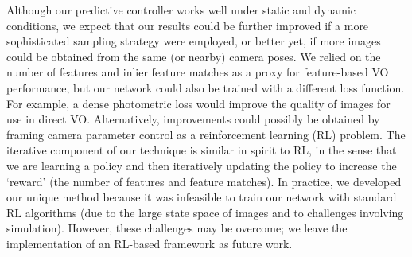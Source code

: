 \documentclass[letterpaper, 10pt, journal, twoside]{IEEEtran}
\begin{document}
Although our predictive controller works well under static and dynamic conditions, we expect that our results could be further improved if a more sophisticated sampling strategy were employed, or better yet, if more images could be obtained from the same (or nearby) camera poses.
We relied on the number of features and inlier feature matches as a proxy for feature-based VO performance, but our network could also be trained with a different loss function.
For example, a dense photometric loss would improve the quality of images for use in direct VO.
Alternatively, improvements could possibly be obtained by framing camera parameter control as a reinforcement learning (RL) problem.
The iterative component of our technique is similar in spirit to RL, in the sense that we are learning a policy and then iteratively updating the policy to increase the `reward' (the number of features and feature matches). 
In practice, we developed our unique method because it was infeasible to train our network with standard RL algorithms (due to the large state space of images and to challenges involving simulation).
However, these challenges may be overcome; we leave the implementation of an RL-based framework as future work.


{\footnotesize


}
\end{document}

